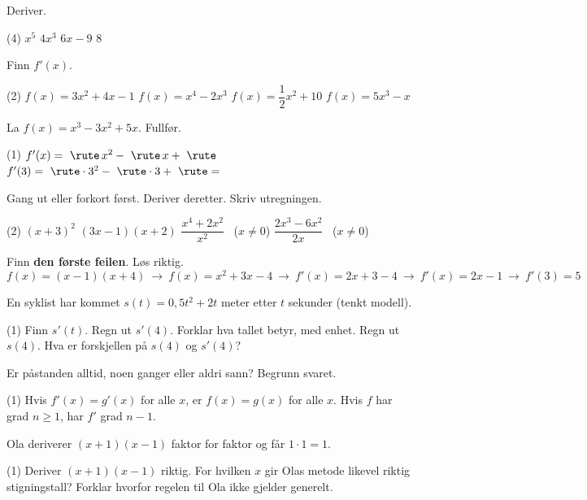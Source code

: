 
Deriver.
\begin{tasks}(4)
  \task $x^5$
  \task $4x^3$
  \task $6x - 9$
  \task $8$
\end{tasks}

Finn $f'(x)$.
\begin{tasks}(2)
  \task $f(x) = 3x^2 + 4x - 1$
  \task $f(x) = x^4 - 2x^3$
  \task $f(x) = \dfrac{1}{2}x^2 + 10$
  \task $f(x) = 5x^3 - x$
\end{tasks}

La $f(x) = x^3 - 3x^2 + 5x$. Fullfør.
\begin{tasks}(1)
  \task $f'(x) = \ \rute\, x^2 - \ \rute\, x + \ \rute$
  \task $f'(3) = \ \rute\cdot 3^2 - \ \rute\cdot 3 + \ \rute = $ \skrivlinje[2cm]
\end{tasks}


Gang ut eller forkort først. Deriver deretter. Skriv utregningen.
\begin{tasks}(2)
  \task $(x + 3)^2$
  \task $(3x - 1)(x + 2)$
  \task $\dfrac{x^4 + 2x^2}{x^2}$ \ ($x \neq 0$)
  \task $\dfrac{2x^3 - 6x^2}{2x}$ \ ($x \neq 0$)
\end{tasks}

Finn \textbf{den første feilen}. Løs riktig.
\[ f(x) = (x-1)(x+4) \ \longrightarrow\ f(x) = x^2 + 3x - 4 \ \longrightarrow\ f'(x) = 2x + 3 - 4 \ \longrightarrow\ f'(x) = 2x - 1 \ \longrightarrow\ f'(3) = 5 \]

En syklist har kommet $s(t) = 0,5t^2 + 2t$ meter etter $t$ sekunder (tenkt modell).
\begin{tasks}(1)
  \task Finn $s'(t)$.
  \task Regn ut $s'(4)$. Forklar hva tallet betyr, med enhet.
  \task Regn ut $s(4)$. Hva er forskjellen på $s(4)$ og $s'(4)$?
\end{tasks}


Er påstanden alltid, noen ganger eller aldri sann? Begrunn svaret.
\begin{tasks}(1)
  \task Hvis $f'(x) = g'(x)$ for alle $x$, er $f(x) = g(x)$ for alle $x$.
  \task Hvis $f$ har grad $n \ge 1$, har $f'$ grad $n - 1$.
\end{tasks}

Ola deriverer $(x+1)(x-1)$ faktor for faktor og får $1\cdot 1 = 1$.
\begin{tasks}(1)
  \task Deriver $(x+1)(x-1)$ riktig.
  \task For hvilken $x$ gir Olas metode likevel riktig stigningstall?
  \task Forklar hvorfor regelen til Ola ikke gjelder generelt.
\end{tasks}

